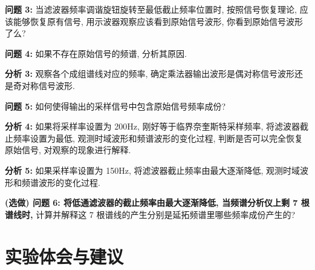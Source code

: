 \documentclass{dspreport}
\begin{document}
\begin{block}

\end{block}

\textbf{问题 3:} 当滤波器频率调谐旋钮旋转至最低截止频率位置时, 按照信号恢复理论, 应该能够恢复原有信号, 用示波器观察应该看到原始信号波形, 你看到原始信号波形了么?

\begin{block}

\end{block}

\textbf{问题 4:} 如果不存在原始信号的频谱, 分析其原因.

\begin{block}

\end{block}

\textbf{分析 3:} 观察各个成组谱线对应的频率, 确定乘法器输出波形是偶对称信号波形还是奇对称信号波形.

\begin{block}

\end{block}

\textbf{问题 5:} 如何使得输出的采样信号中包含原始信号频率成份?

\begin{block}

\end{block}

\textbf{分析 4:} 如果将采样率设置为 200Hz, 刚好等于临界奈奎斯特采样频率, 将滤波器截止频率设置为最低, 观测时域波形和频谱波形的变化过程, 判断是否可以完全恢复原始信号, 对观察的现象进行解释.

\begin{block}

\end{block}

\textbf{分析 5:} 如果采样率设置为 150Hz, 将滤波器截止频率由最大逐渐降低, 观测时域波形和频谱波形的变化过程.

\begin{block}

\end{block}

\textbf{(选做) 问题 6: 将低通滤波器的截止频率由最大逐渐降低, 当频谱分析仪上剩 7 根谱线时,} 计算并解释这 7 根谱线的产生分别是延拓频谱里哪些频率成份产生的?

\begin{block}

\end{block}

\section{实验体会与建议}
\begin{block}

\end{block}
\end{document}
